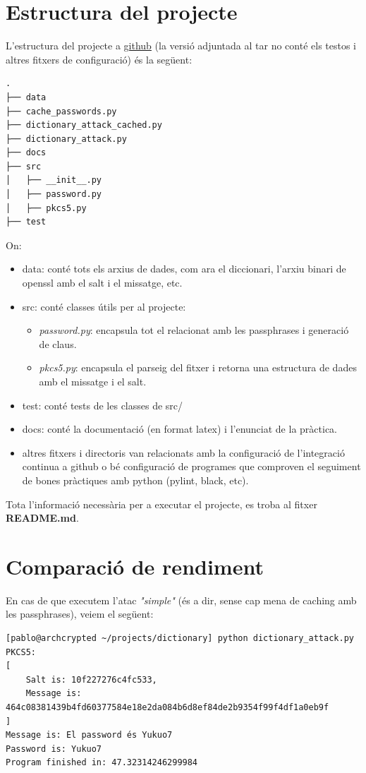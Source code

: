 \documentclass[12pt, letterpaper]{article}
\begin{document}
\section{Estructura del projecte}
L'estructura del projecte a \href{https://github.com/Pablito2020/dictionary-attack}{github} (la versió adjuntada al tar no conté els testos i altres fitxers de configuració) és la següent:
\begin{verbatim}
.
├── data
├── cache_passwords.py
├── dictionary_attack_cached.py
├── dictionary_attack.py
├── docs
├── src
│   ├── __init__.py
│   ├── password.py
│   ├── pkcs5.py
├── test
\end{verbatim}
On:
\begin{itemize}
    \item data: conté tots els arxius de dades, com ara el diccionari, l'arxiu binari de openssl amb el salt i el missatge, etc.
    \item src: conté classes útils per al projecte:
            \begin{itemize}
                \item \textit{password.py}: encapsula tot el relacionat amb les passphrases i generació de claus.
                \item \textit{pkcs5.py}: encapsula el parseig del fitxer i retorna una estructura de dades amb el missatge i el salt.
            \end{itemize}
    \item test: conté tests de les classes de src/
    \item docs: conté la documentació (en format latex) i l'enunciat de la pràctica.
    \item altres fitxers i directoris van relacionats amb la configuració de l'integració continua a github o bé configuració de programes que comproven el seguiment de bones pràctiques amb python (pylint, black, etc).
\end{itemize}

Tota l'informació necessària per a executar el projecte, es troba al fitxer \textbf{README.md}.

\section{Comparació de rendiment}
En cas de que executem l'atac \textit{"simple"} (és a dir, sense cap mena de caching amb les passphrases), veiem el següent:
\begin{verbatim}
[pablo@archcrypted ~/projects/dictionary] python dictionary_attack.py
PKCS5: 
[
	Salt is: 10f227276c4fc533,
	Message is: 464c08381439b4fd60377584e18e2da084b6d8ef84de2b9354f99f4df1a0eb9f
]
Message is: El password és Yukuo7
Password is: Yukuo7
Program finished in: 47.32314246299984
\end{verbatim}
\end{document}
